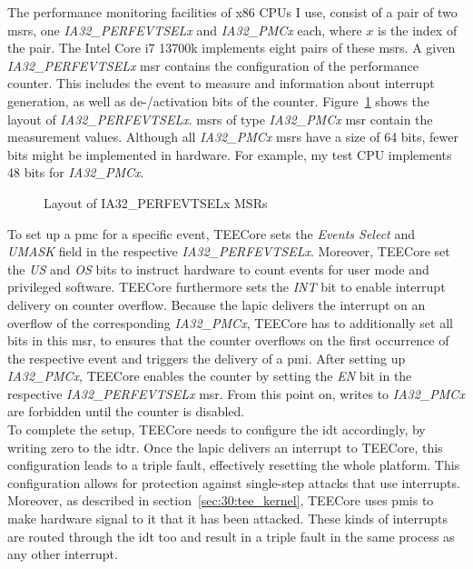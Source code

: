 The performance monitoring facilities of x86 CPUs I use, consist of a pair of
two \glspl{msr}, one \textit{IA32\_PERFEVTSELx} and \textit{IA32\_PMCx} each,
where $x$ is the index of the pair. The Intel Core i7 13700k implements eight
pairs of these \glspl{msr}. A given \textit{IA32\_PERFEVTSELx} \gls{msr}
contains the configuration of the performance counter. This includes the event
to measure and information about interrupt generation, as well as de-/activation
bits of the counter. Figure~\ref{fig:state:technical:perfsel} shows the layout
of \textit{IA32\_PERFEVTSELx}. \glspl{msr} of type \textit{IA32\_PMCx} \gls{msr}
contain the measurement values. Although all \textit{IA32\_PMCx} \glspl{msr}
have a size of 64 bits, fewer bits might be implemented in hardware. For
example, my test CPU implements 48 bits for \textit{IA32\_PMCx}.

\begin{center}
  \begin{figure}
    \centering
    
    \caption{Layout of IA32\_PERFEVTSELx MSRs}
    \label{fig:state:technical:perfsel}
  \end{figure}
\end{center}

To set up a \gls{pmc} for a specific event, TEECore sets the \textit{Events
Select} and \textit{UMASK} field in the respective \textit{IA32\_PERFEVTSELx}.
Moreover, TEECore set the \textit{US} and \textit{OS} bits to instruct hardware
to count events for user mode and privileged software. TEECore furthermore sets
the \textit{INT} bit to enable interrupt delivery on counter overflow. Because
the \gls{lapic} delivers the interrupt on an overflow of the corresponding
\textit{IA32\_PMCx}, TEECore has to additionally set all bits in this \gls{msr},
to ensures that the counter overflows on the first occurrence of the respective
event and triggers the delivery of a \gls{pmi}. After setting up
\textit{IA32\_PMCx}, TEECore enables the counter by setting the \textit{EN} bit
in the respective \textit{IA32\_PERFEVTSELx} \gls{msr}. From this point on,
writes to \textit{IA32\_PMCx} are forbidden until the counter is disabled.\\

To complete the setup, TEECore needs to configure the \gls{idt} accordingly, by
writing zero to the \gls{idtr}. Once the \gls{lapic} delivers an interrupt to
TEECore, this configuration leads to a triple fault, effectively resetting the
whole platform. This configuration allows for protection against single-step
attacks that use interrupts. Moreover, as described in
section~\ref{sec:30:tee_kernel}, TEECore uses \glspl{pmi} to make hardware
signal to it that it has been attacked. These kinds of interrupts are routed
through the \gls{idt} too and result in a triple fault in the same process as
any other interrupt.\\

